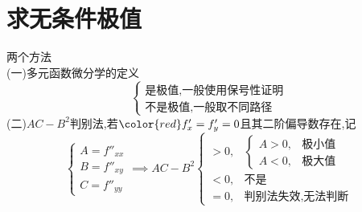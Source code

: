 \documentclass[12pt, a4paper, oneside, UTF8]{ctexbook}
\begin{document}
\section{求无条件极值}
\begin{remark}
    两个方法 \\
    (一)多元函数微分学的定义
    $$
    \begin{cases}
        \text{是极值,一般使用保号性证明} \\
        \text{不是极值,一般取不同路径}
    \end{cases}
    $$
    (二)$AC-B^2$判别法,若$\color{red} f'_x=f'_y=0$且其二阶偏导数存在,记
    $$
    \begin{cases}
        A=f''_{xx} \\
        B=f''_{xy} \\
        C=f''_{yy} 
    \end{cases} \implies AC-B^2\begin{cases}
        > 0, &\begin{cases}
            A > 0, &\text{极小值} \\
            A < 0, &\text{极大值}
        \end{cases} \\
        < 0, &\text{不是} \\
        = 0, &\text{判别法失效,无法判断}
    \end{cases}
    $$
\end{remark}
\end{document}
